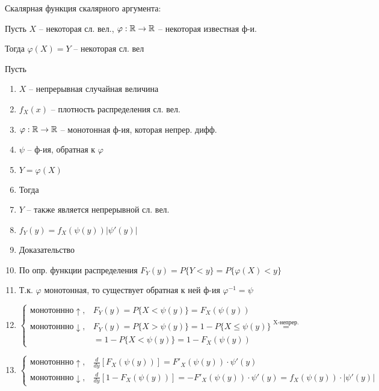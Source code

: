 
Скалярная функция скалярного аргумента:

Пусть $X$ -- некоторая сл. вел., $\varphi:\mathbb{R}\rightarrow\mathbb{R}$ -- некоторая известная ф-и. 

Тогда $\varphi(X)=Y$ -- некоторая сл. вел

\THRM Пусть
\begin{enumerate}[topsep=0pt, leftmargin=20pt, noitemsep]
	\item $X$ -- непрерывная случайная величина
	
	\item $f_X(x)$ -- плотность распределения сл. вел.
	
	\item $\varphi:\mathbb{R}\rightarrow\mathbb{R}$ -- монотонная ф-ия, которая непрер. дифф.
	
	\item $\psi$ -- ф-ия, обратная к $\varphi$
	
	\item $Y=\varphi(X)$
	
	\item [] Тогда
	\setcounter{enumi}{0}
	
	\item $Y$ -- также является непрерывной сл. вел.

	\item $f_Y(y)=f_X(\psi(y))|\psi'(y)|$
	
	\item [] Доказательство
	\setcounter{enumi}{0}
	
	\item [] По опр. функции распределения $F_Y(y)=P\{Y<y\}=P\{\varphi(X)<y\}$
	\item [] Т.к. $\varphi$ монотонная, то существует обратная к ней ф-ия $\varphi^{-1}=\psi$
	\item []$
	\begin{cases}
		\text{монотоннно}\uparrow,  & F_Y(y)=P\{X<\psi(y)\}=F_X(\psi(y))\\
		\text{монотоннно}\downarrow,  & F_Y(y)=P\{X>\psi(y)\}=1-P\{X\leq\psi(y)\}\stackrel{\text{X-непрер.}}{=}\\
		~ & = 1-P\{X<\psi(y)\}=1-F_X(\psi(y))
	\end{cases}$

	\item []$
	\begin{cases}
		\text{монотоннно}\uparrow,  & \tfrac{d}{dy}[F_X(\psi(y))]=F'_X(\psi(y))\cdot\psi'(y)\\
		\text{монотоннно}\downarrow,  & \tfrac{d}{dy}[1-F_X(\psi(y))]=-F'_X(\psi(y))\cdot\psi'(y)=f_X(\psi(y))\cdot|\psi'(y)|
	\end{cases}$
		
\end{enumerate}

